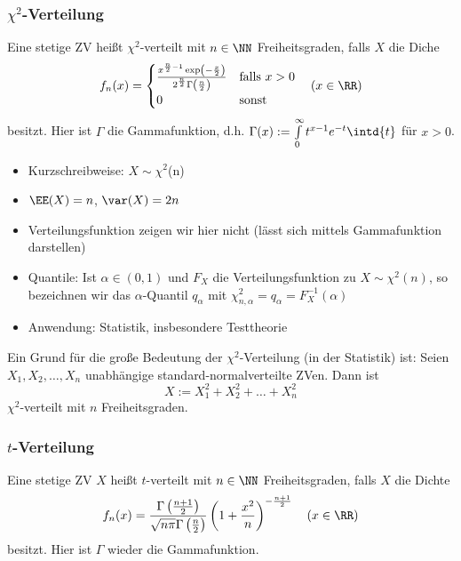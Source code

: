 \subsubsection{\texorpdfstring{$ \chi^2 $}{Chi-Quadrat}-Verteilung}

 Eine stetige ZV heißt $ \chi^2 $-verteilt mit $ n \in \NN $ Freiheitsgraden, falls $ X $ die Diche 
$$f_n(x)=\begin{cases}
\frac{x^{\frac{n}{2}-1}\exp\left(-\frac{x}{2}\right)}{2^{\frac{n}{2}}\Gamma\left(\frac{n}{2}\right)} & \text{falls }x>0\\
0 & \text{sonst}
\end{cases} \quad (x\in \RR)$$
besitzt. Hier ist $\Gamma$ die Gammafunktion, d.h. $\Gamma(x):= \int\limits_{0}^{\infty}t^{x-1}e^{-t}\intd{t}$ für $x>0$.

\begin{itemize}
	\item Kurzschreibweise: $X\sim \chi^{2}$(n)
	\item $\EE(X)=n$, $\var(X)=2n$
	\item Verteilungsfunktion zeigen wir hier nicht (lässt sich mittels Gammafunktion darstellen)
	\item Quantile: Ist $\alpha\in (0,1)$ und $F_X$ die Verteilungsfunktion zu $X \sim \chi^{2}(n)$, so bezeichnen wir das $\alpha$-Quantil $q_\alpha$ mit $\chi^{2}_{n,\alpha}=q_{\alpha}=F_X^{-1}(\alpha)$
	\item Anwendung: Statistik, insbesondere Testtheorie
\end{itemize}

Ein Grund für die große Bedeutung der $ \chi^2 $-Verteilung (in der Statistik) ist:
 Seien $ X_1, X_2, \ldots, X_n $ unabhängige standard-normalverteilte ZVen. Dann ist 
$$ X:=X_1^{2} + X_2^{2}+\ldots + X_n^{2} $$
$ \chi^{2} $-verteilt mit $ n $ Freiheitsgraden.

\subsubsection{\texorpdfstring{$ t $}{t}-Verteilung}

 Eine stetige ZV $X$ heißt $t$-verteilt mit $n\in \NN$ Freiheitsgraden, falls $X$ die Dichte 
\[ f_n(x)=\frac{\Gamma\left(\frac{n+1}{2}\right)}{\sqrt{n \pi}\Gamma\left(\frac{n}{2}\right)}\left(1+\frac{x^2}{n}\right)^{-\frac{n+1}{2}} \quad (x\in \RR) \]
besitzt. Hier ist $\Gamma$ wieder die Gammafunktion.

